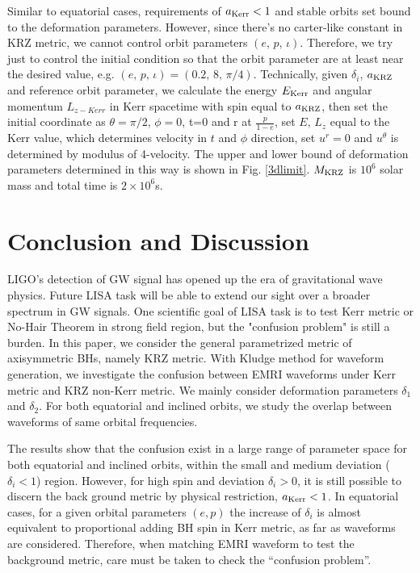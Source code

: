 \documentclass{article}
\begin{document}
Similar to equatorial cases, requirements of $a_{\rm{Kerr}}<1$ and stable orbits set bound to the deformation parameters. However, since there's no carter-like constant in KRZ metric, we cannot control orbit parameters $(e,\, p,\, \iota)$. Therefore, we try just to control the initial condition so that the orbit parameter are at least near the desired value, e.g. $(e,\, p,\, \iota) = (0.2,\, 8,\, \pi/4 )$. Technically, given $\delta_i$, $a_{\rm{KRZ}}$ and reference orbit parameter, we calculate the energy $E_{\rm{Kerr}}$ and angular momentum $L_{z -Kerr}$ in Kerr spacetime with spin equal to $a_{\rm{KRZ}}$, then set the initial coordinate as $\theta=\pi/2$, $\phi=0$, t=0 and r at $\frac{p}{1-e}$, set $E,\, L_z$ equal to the Kerr value, which determines velocity in $t$ and $\phi$ direction, set $u^r=0$ and $u^\theta$ is determined by modulus of 4-velocity. The upper and lower bound of deformation parameters determined in this way is shown in Fig. \ref{3dlimit}. $M_{\rm{KRZ}}$ is $10^6$ solar mass and total time is $2\times 10^6$s.


\section{Conclusion and Discussion}
\label{p_fin}

LIGO's detection of GW signal has opened up the era of gravitational wave physics. Future LISA task will be able to extend our sight over a broader spectrum in GW signals. One scientific goal of LISA task is to test Kerr metric or No-Hair Theorem in strong field region, but the "confusion problem" is still a burden. In this paper, we consider the general parametrized metric of axisymmetric BHs, namely KRZ metric. With Kludge method for waveform generation, we investigate the confusion between EMRI waveforms under Kerr metric and KRZ non-Kerr metric. We mainly consider deformation parameters $\delta_1$ and $\delta_2$. For both equatorial and inclined orbits, we study the overlap between waveforms of same orbital frequencies.

The results show that the confusion exist in a large range of parameter space for both equatorial and inclined orbits, within the small and medium deviation ($\delta_i<1$) region. However, for high spin and deviation $\delta_i>0$, it is still possible to discern the back ground metric by physical restriction, $a_{\rm{Kerr}}<1$. In equatorial cases, for a given orbital parameters $(e,p)$ the increase of $\delta_i$ is almost equivalent to proportional adding BH spin in Kerr metric, as far as waveforms are considered. Therefore, when matching EMRI waveform to test the background metric, care must be taken to check the ``confusion problem''. 
\end{document}
